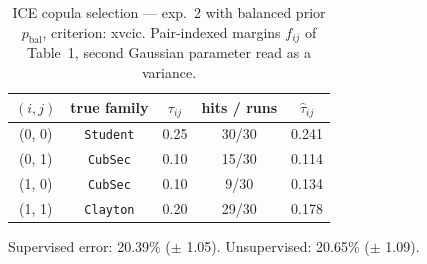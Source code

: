 \begin{table}[htbp]
  \centering
  \caption{ICE copula selection — exp.\ 2 with balanced prior $p_{\text{bal}}$, criterion: xvcic. Pair-indexed margins $f_{ij}$ of Table~1, second Gaussian parameter read as a variance.}
  \label{tab:exp3-exp2_bal_p__xvcic}
  \begin{tabular}{ccccc}
    \toprule
    $(i, j)$ & true family & $\tau_{ij}$ & hits / runs & $\hat\tau_{ij}$ \\
    \midrule
    (0, 0) & \texttt{Student} & 0.25 & 30/30 & 0.241 \\
    (0, 1) & \texttt{CubSec} & 0.10 & 15/30 & 0.114 \\
    (1, 0) & \texttt{CubSec} & 0.10 & 9/30 & 0.134 \\
    (1, 1) & \texttt{Clayton} & 0.20 & 29/30 & 0.178 \\
    \bottomrule
  \end{tabular}
  \par\smallskip Supervised error: 20.39\% ($\pm$ 1.05). Unsupervised: 20.65\% ($\pm$ 1.09).
\end{table}
